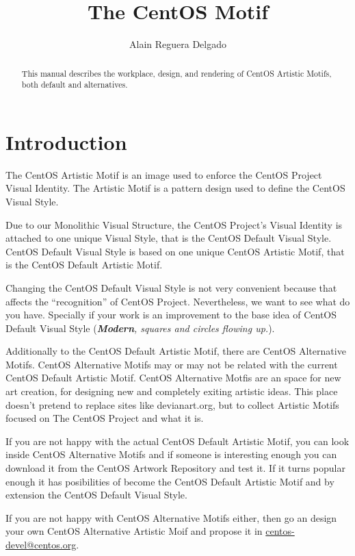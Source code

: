 \documentclass{article}
\title{The CentOS Motif}
\author{Alain Reguera Delgado}
\begin{document}
\maketitle

\begin{abstract}
This manual describes the workplace, design, and rendering of CentOS
Artistic Motifs, both default and alternatives.
\end{abstract}

\tableofcontents

\section{Introduction}

The CentOS Artistic Motif is an image used to enforce the CentOS
Project Visual Identity. The Artistic Motif is a pattern design used
to define the CentOS Visual Style.

Due to our Monolithic Visual Structure, the CentOS Project's Visual
Identity is attached to one unique Visual Style, that is the CentOS
Default Visual Style. CentOS Default Visual Style is based on one
unique CentOS Artistic Motif, that is the CentOS Default Artistic
Motif.

Changing the CentOS Default Visual Style is not very convenient
because that affects the ``recognition'' of CentOS Project.
Nevertheless, we want to see what do you have.  Specially if your work
is an improvement to the base idea of CentOS Default Visual Style
(\emph{\textbf{Modern}, squares and circles flowing up.}).

Additionally to the CentOS Default Artistic Motif, there are CentOS
Alternative Motifs.  CentOS Alternative Motifs may or may not be
related with the current CentOS Default Artistic Motif.  CentOS
Alternative Motfis are an space for new art creation, for designing
new and completely exiting artistic ideas.  This place doesn't pretend
to replace sites like devianart.org, but to collect Artistic Motifs
focused on The CentOS Project and what it is.

If you are not happy with the actual CentOS Default Artistic Motif,
you can look inside CentOS Alternative Motifs and if someone is
interesting enough you can download it from the CentOS Artwork
Repository and test it. If it turns popular enough it has posibilities
of become the CentOS Default Artistic Motif and by extension the
CentOS Default Visual Style.

If you are not happy with CentOS Alternative Motifs either, then go an
design your own CentOS Alternative Artistic Moif and propose it in
\href{mailto:centos-devel@centos.org}{centos-devel@centos.org}.
\end{document}
